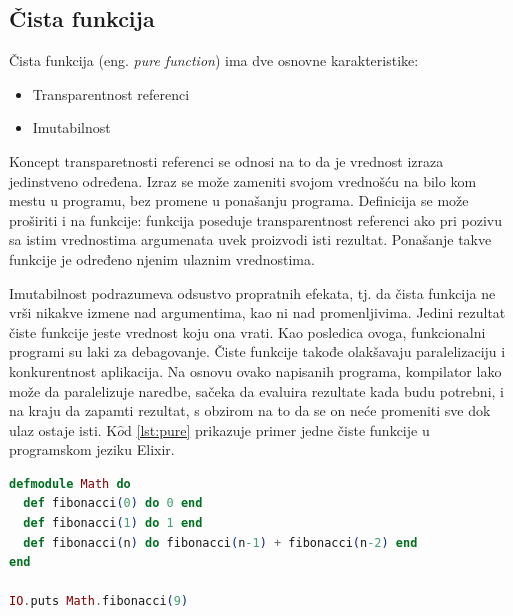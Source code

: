 \documentclass[12pt,oneside]{memoir}
\begin{document}
\subsection{Čista funkcija}
\par  Čista funkcija (eng. \textit{pure function}) ima dve osnovne karakteristike: 
\begin{itemize}
\item Transparentnost referenci 
\item Imutabilnost 
\end{itemize}
\par  Koncept transparetnosti referenci se odnosi na to da je vrednost izraza jedinstveno određena. Izraz se može zameniti svojom vrednošću na bilo kom mestu u programu, bez promene u ponašanju programa. Definicija se može proširiti i na funkcije: funkcija poseduje transparentnost referenci ako pri pozivu sa istim vrednostima argumenata uvek proizvodi isti rezultat. Ponašanje takve funkcije je određeno njenim ulaznim vrednostima.
\par Imutabilnost podrazumeva odsustvo propratnih efekata, tj. da čista funkcija ne vrši nikakve izmene nad argumentima, kao ni nad promenljivima. Jedini rezultat čiste funkcije jeste vrednost koju ona vrati. Kao posledica ovoga, funkcionalni programi su laki za debagovanje. Čiste funkcije takođe olakšavaju paralelizaciju i konkurentnost aplikacija. Na osnovu ovako napisanih programa, kompilator lako može da paralelizuje naredbe, sačeka da evaluira rezultate kada budu potrebni, i na kraju da zapamti rezultat, s obzirom na to da se on neće promeniti sve dok ulaz ostaje isti. K$\hat{o}$d \ref{lst:pure} prikazuje primer jedne čiste funkcije u programskom jeziku Elixir. 

\begin{lstlisting}[language=elixir, caption={Primer čiste funkcije},captionpos=b, label={lst:pure}]
defmodule Math do 
  def fibonacci(0) do 0 end
  def fibonacci(1) do 1 end
  def fibonacci(n) do fibonacci(n-1) + fibonacci(n-2) end
end

IO.puts Math.fibonacci(9)
\end{lstlisting}
\end{document}
